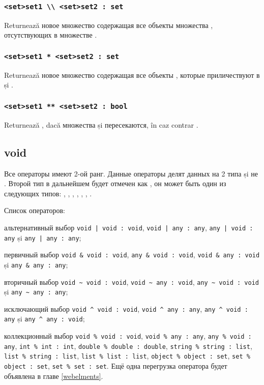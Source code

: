 \subsubsection{\lstinline`<set>set1 \\ <set>set2 : set`}

Returnează новое множество содержащая все объекты множества , отсутствующих в множестве .

\subsubsection{\lstinline`<set>set1 * <set>set2 : set`}

Returnează новое множество содержащая все объекты , которые приличествуют в  și .

\subsubsection{\lstinline`<set>set1 ** <set>set2 : bool`}

Returnează \true, dacă множества  și  пересекаются, în caz contrar \false.

\subsection{\color{lightblue}void}

Все \void{} операторы имеют 2-ой ранг. Данные операторы делят данных на 2 типа \void{} și не \void{}. Второй тип в дальнейшем будет отмечен как , он может быть один из следующих типов: \integer{}, \double{}, \str{}, \listtype{}, \object{}, \set{}, \element{}.

Список \void{} операторов:

\begin{icItems}
\item
	альтернативный выбор \lstinline`void | void : void`, \lstinline`void | any : any`, \lstinline`any | void : any` și \lstinline`any | any : any`;
\item
	первичный выбор \lstinline|void & void : void|, \lstinline|any & void : void|, \lstinline|void & any : void| și \lstinline|any & any : any|;
\item
	вторичный выбор \lstinline|void ~ void : void|, \lstinline|void ~ any : void|, \lstinline|any ~ void : void| și \lstinline|any ~ any : any|;
\item
	исключающий выбор \lstinline|void ^ void : void|, \lstinline|void ^ any : any|, \lstinline|any ^ void : any| și \lstinline|any ^ any : void|;
\item
	коллекционный выбор \lstinline|void % void : void|, \lstinline|void % any : any|, \lstinline|any % void : any|, \lstinline|int % int : int|, \lstinline|double % double : double|, \lstinline|string % string : list|, \lstinline|list % string : list|, \lstinline|list % list : list|, \lstinline|object % object : set|, \lstinline|set % object : set|, \lstinline|set % set : set|. Ещё одна перегрузка оператора будет объявлена в главе \ref{webelments}.
\end{icItems}

